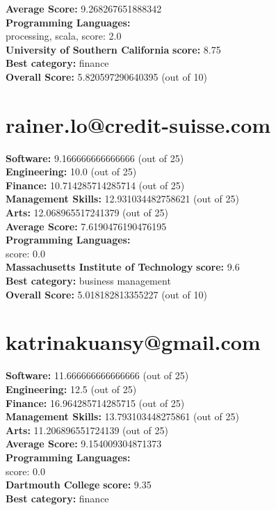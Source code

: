 \documentclass{article}
\begin{document}
\textbf{Average Score: } 9.268267651888342\\
\textbf{Programming Languages:} \\
processing, scala, score: 2.0\\
\textbf{University of Southern California} \textbf{score:} 8.75\\
\textbf{Best category: } finance\\
\textbf{Overall Score: }5.820597290640395 (out of 10)\section{rainer.lo@credit-suisse.com}
\textbf{Software:} 9.166666666666666 (out of 25)\\
\textbf{Engineering: } 10.0 (out of 25)\\
\textbf{Finance:} 10.714285714285714 (out of 25)\\
\textbf{Management Skills:} 12.931034482758621 (out of 25)\\
\textbf{Arts:} 12.068965517241379 (out of 25)\\
\textbf{Average Score: } 7.6190476190476195\\
\textbf{Programming Languages:} \\
score: 0.0\\
\textbf{Massachusetts Institute of Technology} \textbf{score:} 9.6\\
\textbf{Best category: } business management\\
\textbf{Overall Score: }5.018182813355227 (out of 10)\section{katrinakuansy@gmail.com}
\textbf{Software:} 11.666666666666666 (out of 25)\\
\textbf{Engineering: } 12.5 (out of 25)\\
\textbf{Finance:} 16.964285714285715 (out of 25)\\
\textbf{Management Skills:} 13.793103448275861 (out of 25)\\
\textbf{Arts:} 11.206896551724139 (out of 25)\\
\textbf{Average Score: } 9.154009304871373\\
\textbf{Programming Languages:} \\
score: 0.0\\
\textbf{Dartmouth College} \textbf{score:} 9.35\\
\textbf{Best category: } finance\\
\end{document}
